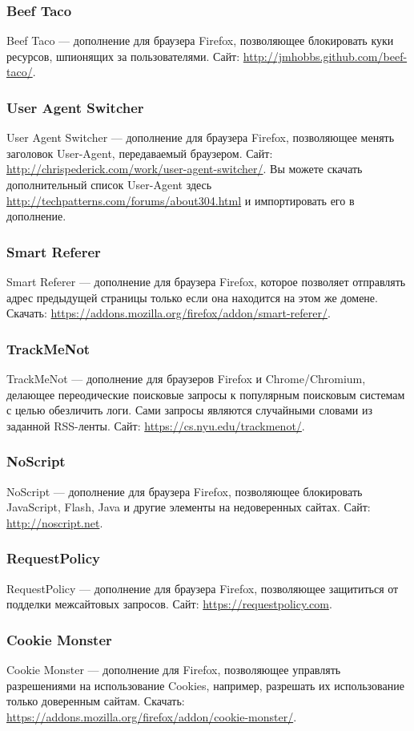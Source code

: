 \subsubsection{Beef Taco}
Beef Taco --- дополнение для браузера Firefox, позволяющее блокировать куки ресурсов, шпионящих за пользователями. Сайт: \url{http://jmhobbs.github.com/beef-taco/}.
\subsubsection{User Agent Switcher}
User Agent Switcher --- дополнение для браузера Firefox, позволяющее менять заголовок User-Agent, передаваемый браузером. Сайт: \url{http://chrispederick.com/work/user-agent-switcher/}. Вы можете скачать дополнительный список User-Agent здесь \url{http://techpatterns.com/forums/about304.html} и импортировать его в дополнение.
\subsubsection{Smart Referer}
Smart Referer --- дополнение для браузера Firefox, которое позволяет отправлять адрес предыдущей страницы только если она находится на этом же домене. Скачать: \url{https://addons.mozilla.org/firefox/addon/smart-referer/}.
\subsubsection{TrackMeNot}
TrackMeNot --- дополнение для браузеров Firefox и Chrome/Chromium, делающее переодические поисковые запросы к популярным поисковым системам с целью обезличить логи. Сами запросы являются случайными словами из заданной RSS-ленты. Сайт: \url{https://cs.nyu.edu/trackmenot/}.
\subsubsection{NoScript}
NoScript --- дополнение для браузера Firefox, позволяющее блокировать JavaScript, Flash, Java и другие элементы на недоверенных сайтах. Сайт: \url{http://noscript.net}.
\subsubsection{RequestPolicy}
RequestPolicy --- дополнение для браузера Firefox, позволяющее защититься от подделки межсайтовых запросов. Сайт: \url{https://requestpolicy.com}.
\subsubsection{Cookie Monster}
Cookie Monster --- дополнение для Firefox, позволяющее управлять разрешениями на использование Cookies, например, разрешать их использование только доверенным сайтам. Скачать: \url{https://addons.mozilla.org/firefox/addon/cookie-monster/}.
